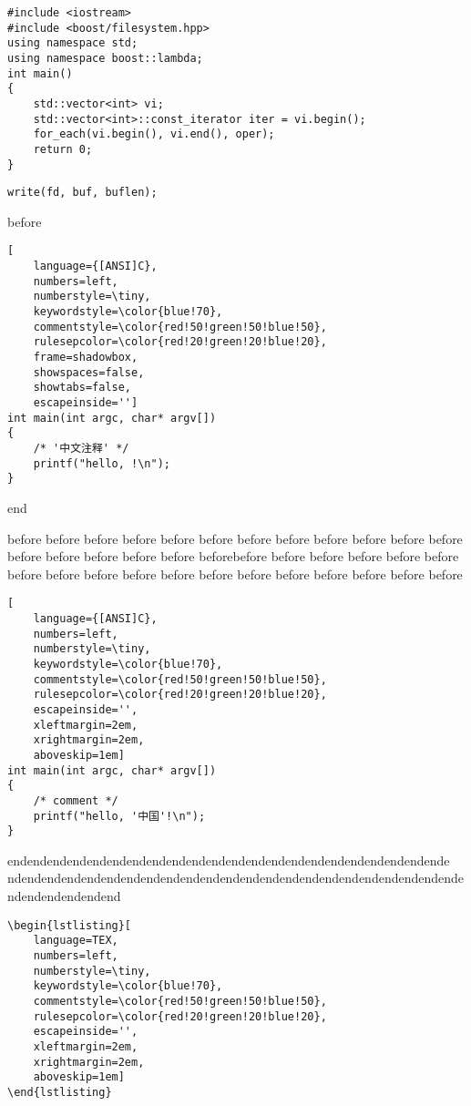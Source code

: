 \documentclass{article}
\begin{document}
\begin{CJK*}{GBK}{song}


\begin{lstlisting}[frame=lines,caption=sync highlight test]
#include <iostream>
#include <boost/filesystem.hpp>
using namespace std;
using namespace boost::lambda;
int main()
{
    std::vector<int> vi;
    std::vector<int>::const_iterator iter = vi.begin();
    for_each(vi.begin(), vi.end(), oper);
    return 0;
}
\end{lstlisting}

\begin{lstlisting}[backgroundcolor=\color{red!50!green!50!blue!50},frame=single,framerule=0pt]
write(fd, buf, buflen);
\end{lstlisting}

before
\begin{lstlisting}[
    language={[ANSI]C},
    numbers=left,
    numberstyle=\tiny,
    keywordstyle=\color{blue!70},
    commentstyle=\color{red!50!green!50!blue!50},
    rulesepcolor=\color{red!20!green!20!blue!20},
    frame=shadowbox,
    showspaces=false,
    showtabs=false,
    escapeinside='']
int main(int argc, char* argv[])
{
    /* '中文注释' */
    printf("hello, !\n");
}
\end{lstlisting}
end

before before before before before before before before before
before before before before before before before before beforebefore before before before before before before before before
before before before before before before before before before
\begin{lstlisting}[
    language={[ANSI]C},
    numbers=left,
    numberstyle=\tiny,
    keywordstyle=\color{blue!70},
    commentstyle=\color{red!50!green!50!blue!50},
    rulesepcolor=\color{red!20!green!20!blue!20},
    escapeinside='',
    xleftmargin=2em,
    xrightmargin=2em,
    aboveskip=1em]
int main(int argc, char* argv[])
{
    /* comment */
    printf("hello, '中国'!\n");
}
\end{lstlisting}
endendendendendendendendendendendendendendendendendendendendendende
ndendendendendendendendendendendendendendendendendendendendendendende
ndendendendendend

\begin{verbatim}
\begin{lstlisting}[
    language=TEX,
    numbers=left,
    numberstyle=\tiny,
    keywordstyle=\color{blue!70},
    commentstyle=\color{red!50!green!50!blue!50},
    rulesepcolor=\color{red!20!green!20!blue!20},
    escapeinside='',
    xleftmargin=2em,
    xrightmargin=2em,
    aboveskip=1em]
\end{lstlisting}
\end{verbatim}

\end{CJK*}
\end{document}
